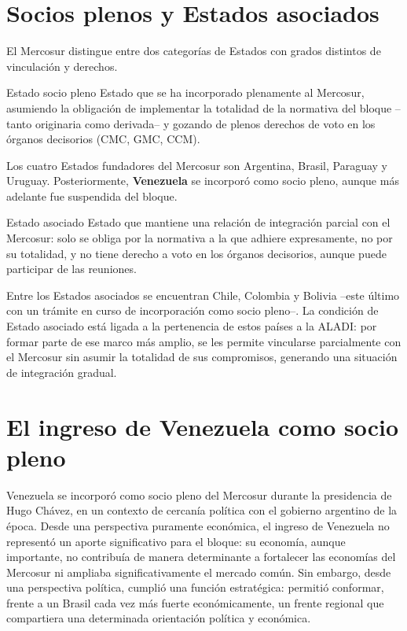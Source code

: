 \documentclass[12pt,oneside]{book}
\begin{document}
\section{Socios plenos y Estados asociados}

El Mercosur distingue entre dos categorías de Estados con grados distintos de vinculación y derechos.

\begin{definicion}{Estado socio pleno}
Estado que se ha incorporado plenamente al Mercosur, asumiendo la obligación de implementar la totalidad de la normativa del bloque --tanto originaria como derivada-- y gozando de plenos derechos de voto en los órganos decisorios (CMC, GMC, CCM).
\end{definicion}

Los cuatro Estados fundadores del Mercosur son Argentina, Brasil, Paraguay y Uruguay. Posteriormente, \textbf{Venezuela} se incorporó como socio pleno, aunque más adelante fue suspendida del bloque.

\begin{definicion}{Estado asociado}
Estado que mantiene una relación de integración parcial con el Mercosur: solo se obliga por la normativa a la que adhiere expresamente, no por su totalidad, y no tiene derecho a voto en los órganos decisorios, aunque puede participar de las reuniones.
\end{definicion}

Entre los Estados asociados se encuentran Chile, Colombia y Bolivia --este último con un trámite en curso de incorporación como socio pleno--. La condición de Estado asociado está ligada a la pertenencia de estos países a la ALADI: por formar parte de ese marco más amplio, se les permite vincularse parcialmente con el Mercosur sin asumir la totalidad de sus compromisos, generando una situación de integración gradual.

\section{El ingreso de Venezuela como socio pleno}

Venezuela se incorporó como socio pleno del Mercosur durante la presidencia de Hugo Chávez, en un contexto de cercanía política con el gobierno argentino de la época. Desde una perspectiva puramente económica, el ingreso de Venezuela no representó un aporte significativo para el bloque: su economía, aunque importante, no contribuía de manera determinante a fortalecer las economías del Mercosur ni ampliaba significativamente el mercado común. Sin embargo, desde una perspectiva política, cumplió una función estratégica: permitió conformar, frente a un Brasil cada vez más fuerte económicamente, un frente regional que compartiera una determinada orientación política y económica.
\end{document}
